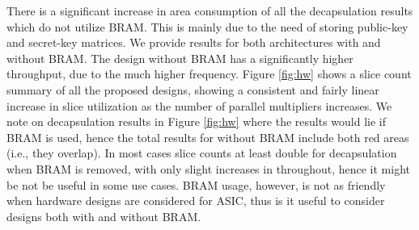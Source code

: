 There is a significant increase in area consumption of all the decapsulation results which do not utilize BRAM. This is mainly due to the need of storing public-key and secret-key matrices. We provide results for both architectures with and without BRAM. The design without BRAM has a significantly higher throughput, due to the much higher frequency. %
Figure \ref{fig:hw} shows a slice count summary of all the proposed designs, showing a consistent and fairly linear increase in slice utilization as the number of parallel multipliers increases. We note on decapsulation results in Figure \ref{fig:hw} where the results would lie if BRAM is used, hence the total results for without BRAM include both red areas (i.e., they overlap). In most cases slice counts at least double for decapsulation when BRAM is removed, with only slight increases in throughout, hence it might be not be useful in some use cases. BRAM usage, however, is not as friendly when hardware designs are considered for ASIC, thus is it useful to consider designs both with and without BRAM.


